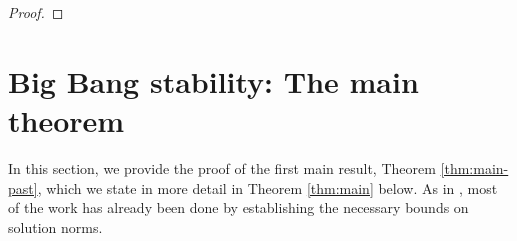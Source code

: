 \documentclass[11pt,leqno,textwidth=10cm]{amsart}
\numberwithin{equation}{section}
\theoremstyle{definition}
\theoremstyle{plain}
\newcommand{\1}{\mathbbm{1}}
\renewcommand{\epsilon}{\varepsilon}
\newcommand{\todo}[1]{\textcolor{red}{#1}}
\begin{document}
\begin{proof}
\end{proof}

\section{Big Bang stability: The main theorem}\label{sec:main-thm}

In this section, we provide the proof of the first main result, Theorem \ref{thm:main-past}, which we state in more detail in Theorem \ref{thm:main} below. As in \cite{Rodnianski2014,Speck2018}, most of the work has already been done by establishing the necessary bounds on solution norms.
\end{document}
